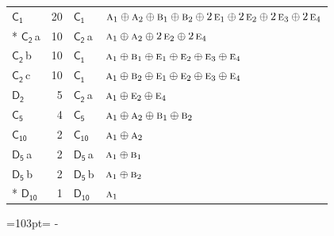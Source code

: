 \documentclass[10pt,a4paper]{article}
\newcommand{\needspace}[1]{\par\penalty-100\begingroup\dimen0=#1\relax\dimen2=\pagegoal
  \advance\dimen2-\pagetotal\ifdim\dimen0>\dimen2\relax\ifdim\dimen2>0pt\vfil\break\fi\fi
  \endgroup}
\numberwithin{equation}{section}
\newcommand{\grp}[1]{\mathsf{#1}}
\newcommand{\irr}[1]{\text{\normalfont\scshape #1}}
\newcommand{\clsletter}[1]{\,{\scriptsize\color{black!55}#1}}
\newlength{\fillwidth}\newlength{\cellwidth}\newlength{\colwidth}
\begin{document}
{\begin{longtable}{@{}lrl>{\RaggedRight\arraybackslash}p{\fillwidth}@{}}
\bottomrule\endfoot\endlastfoot
\href{C1.pdf}{$\grp{C_{1}}$} & 20 & \href{C1.pdf}{$\grp{C_{1}}$} & $\irr{a}_{1}\oplus \irr{a}_{2}\oplus \irr{b}_{1}\oplus \irr{b}_{2}\oplus 2\,\irr{e}_{1}\oplus 2\,\irr{e}_{2}\oplus 2\,\irr{e}_{3}\oplus 2\,\irr{e}_{4}$\\*
\href{C2.pdf}{$\grp{C_{2}}$}\clsletter{a} & 10 & \href{C2.pdf}{$\grp{C_{2}}$}\clsletter{a} & $\irr{a}_{1}\oplus \irr{a}_{2}\oplus 2\,\irr{e}_{2}\oplus 2\,\irr{e}_{4}$\\
\href{C2.pdf}{$\grp{C_{2}}$}\clsletter{b} & 10 & \href{C1.pdf}{$\grp{C_{1}}$} & $\irr{a}_{1}\oplus \irr{b}_{1}\oplus \irr{e}_{1}\oplus \irr{e}_{2}\oplus \irr{e}_{3}\oplus \irr{e}_{4}$\\
\href{C2.pdf}{$\grp{C_{2}}$}\clsletter{c} & 10 & \href{C1.pdf}{$\grp{C_{1}}$} & $\irr{a}_{1}\oplus \irr{b}_{2}\oplus \irr{e}_{1}\oplus \irr{e}_{2}\oplus \irr{e}_{3}\oplus \irr{e}_{4}$\\
\href{D2.pdf}{$\grp{D_{2}}$} & 5 & \href{C2.pdf}{$\grp{C_{2}}$}\clsletter{a} & $\irr{a}_{1}\oplus \irr{e}_{2}\oplus \irr{e}_{4}$\\
\href{C5.pdf}{$\grp{C_{5}}$} & 4 & \href{C5.pdf}{$\grp{C_{5}}$} & $\irr{a}_{1}\oplus \irr{a}_{2}\oplus \irr{b}_{1}\oplus \irr{b}_{2}$\\
\href{C10.pdf}{$\grp{C_{10}}$} & 2 & \href{C10.pdf}{$\grp{C_{10}}$} & $\irr{a}_{1}\oplus \irr{a}_{2}$\\
\href{D5.pdf}{$\grp{D_{5}}$}\clsletter{a} & 2 & \href{D5.pdf}{$\grp{D_{5}}$}\clsletter{a} & $\irr{a}_{1}\oplus \irr{b}_{1}$\\
\href{D5.pdf}{$\grp{D_{5}}$}\clsletter{b} & 2 & \href{D5.pdf}{$\grp{D_{5}}$}\clsletter{b} & $\irr{a}_{1}\oplus \irr{b}_{2}$\\*
\href{D10.pdf}{$\grp{D_{10}}$} & 1 & \href{D10.pdf}{$\grp{D_{10}}$} & $\irr{a}_{1}$\\
\bottomrule\end{longtable}}
\needspace{103pt}
\end{document}
